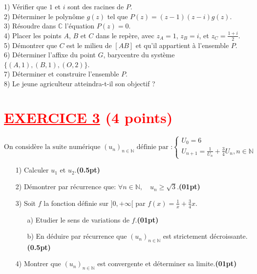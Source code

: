 \documentclass[12pt]{article}
\begin{document}
1) Vérifier que \(1\) et \(i\) sont des racines de \(P\). \\
2) Déterminer le polynôme \( g(z) \) tel que \( P(z) = (z-1)(z-i)g(z) \). \\
3) Résoudre dans \( \mathbb{C} \) l'équation \( P(z) = 0 \). \\
4) Placer les points \( A \), \( B \) et \( C \) dans le repère, avec \( z_A = 1 \), \( z_B = i \), et \( z_C = \frac{1+i}{2} \). \\
5) Démontrer que \( C \) est le milieu de \( [AB] \) et qu'il appartient à l'ensemble \( P \). \\
6) Déterminer l'affixe du point \( G \), barycentre du système \( \{(A,1), (B,1), (O,2)\} \). \\
7) Déterminer et construire l'ensemble \( P \). \\
8) Le jeune agriculteur atteindra-t-il son objectif ?

\section*{\textcolor{red}{\underline{EXERCICE 3} (4 points) }}
\[
\text{On considère la suite numérique } (u_n)_{n \in \mathbb{N}} \text{ définie par :}
\begin{cases}
U_{0}=6\\
U_{n+1}=\frac{1}{U_{n}}+\frac{3}{4}U_{n}, n\in\mathbb{N}
\end{cases}
\]
\begin{enumerate}
\item[1)] Calculer \( u_1 \) et \( u_2 \).\textbf{(0.5pt)}

\item[2)] Démontrer par récurrence que: \( \forall n\in\mathbb{N},\quad u_n \geq \sqrt{3} \).\textbf{(01pt)}

\item[3)] Soit $f$ la fonction définie sur $]0, +\infty[$ par \( f(x) = \frac{1}{x} + \frac{3}{4}x \).
\begin{enumerate}
\item[a)] Etudier le sens de variations de $f$.\textbf{(01pt)}
\item[b)] En déduire par récurrence que $(u_n)_{n \in \mathbb{N}}$ est strictement décroissante.\textbf{(0.5pt)}
\end{enumerate}

\item[4)] Montrer que $(u_n)_{n \in \mathbb{N}}$ est convergente et déterminer sa limite.\textbf{(01pt)}

\end{enumerate}
\end{document}
